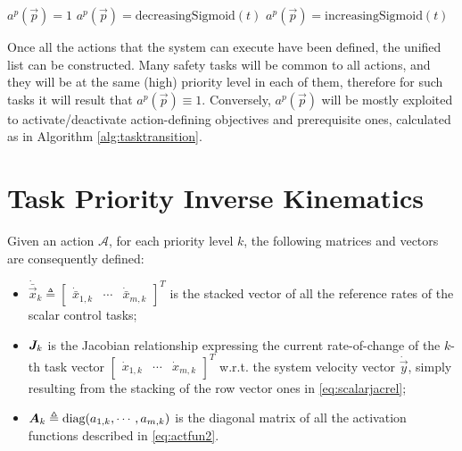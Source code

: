 \begin{algorithm}
	\caption{Tasks transition algorithm}\label{alg:tasktransition}
	\begin{algorithmic}[1]
		\State $a^p(\vec{p}) = 1$
		\EndIf
		\State $a^p(\vec{p}) = \textrm{decreasingSigmoid}(t)$ 
		\EndIf
		\State $a^p(\vec{p}) = \textrm{increasingSigmoid}(t)$
		\EndIf
		\EndFor		
	\end{algorithmic}
\end{algorithm}

Once all the actions that the system can execute have been defined, the unified list can be constructed. Many safety tasks will be common to all actions, and they will be at the same (high) priority level in each of them, therefore for such tasks it will result that $a^p(\vec{p}) \equiv 1$. Conversely, $a^p(\vec{p})$ will be mostly exploited to activate/deactivate action-defining objectives and prerequisite ones, calculated as in Algorithm \ref{alg:tasktransition}.  

\section{Task Priority Inverse Kinematics}\label{sec:tpik}

Given an action $\mathcal{A}$, for each priority level $k$, the following matrices and vectors are consequently defined:
\begin{itemize}
	\item $\dot{\bar{\vec{x}}}_k \triangleq \begin{bmatrix}\dot{\bar{x}}_{1,k} & \cdots & \dot{\bar{x}}_{m,k}\end{bmatrix}^T$ is the stacked vector of all the reference rates of the scalar control tasks;
	\item $\bm{J}_k$ is the Jacobian relationship  expressing the current rate-of-change of the $k$-th task vector $\begin{bmatrix}\dot{{x}}_{1,k} & \cdots & \dot{{x}}_{m,k}\end{bmatrix}^T$ w.r.t. the system velocity vector $\dot{\vec{y}}$, simply resulting from the stacking of the row vector ones in \eqref{eq:scalarjacrel};
	\item $\bm{A}_k \triangleq \textrm{diag}(a_{1,k},  \cdots,  a_{m,k})$ is the diagonal matrix of all the activation functions described in \eqref{eq:actfun2}.
\end{itemize}



